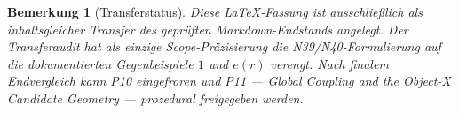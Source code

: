 \documentclass[11pt,a4paper]{amsart}
\newtheorem{remark}[theorem]{Bemerkung}
\begin{document}
\begin{remark}[Transferstatus]
Diese LaTeX-Fassung ist ausschließlich als inhaltsgleicher Transfer des
geprüften Markdown-Endstands angelegt. Der Transferaudit hat als einzige
Scope-Präzisierung die N39/N40-Formulierung auf die dokumentierten Gegenbeispiele
$1$ und $e(r)$ verengt. Nach finalem Endvergleich kann P10 eingefroren und P11
--- \emph{Global Coupling and the Object-X Candidate Geometry} ---
prozedural freigegeben werden.
\end{remark}
\end{document}
